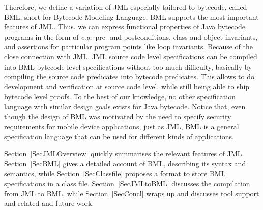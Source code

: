 Therefore, we define a variation of JML especially tailored to
bytecode, called BML, short for Bytecode Modeling Language.
BML supports the most important features of JML. Thus, we can express
functional properties of Java bytecode programs in the form of
\emph{e.g.}\ pre- and postconditions, class and object invariants, and
assertions for particular program points like loop invariants. Because
of the close connection with JML, JML source code level specifications
can be compiled into BML bytecode level specifications without too
much difficulty, basically by compiling the source code predicates
into bytecode predicates.  This allows to do development and
verification at source code level, while still being able to ship
bytecode level proofs.  To the best of our knowledge, no other
specification language with similar design goals exists for Java
bytecode. Notice that, even though the design of BML was motivated by
the need to specify security requirements for mobile device
applications, just as JML, BML is a general specification language
that can be used for different kinds of applications.

Section~\ref{SecJMLOverview} quickly summarises the relevant features
of JML. Section~\ref{SecBML} gives a detailed account of BML,
describing its syntax and semantics, while Section~\ref{SecClassfile}
proposes a format to store BML specifications in a class
file. Section~\ref{SecJMLtoBML} discusses the compilation from JML to
BML, while Section~\ref{SecConcl} wraps up and discusses tool support
and related and future work.


